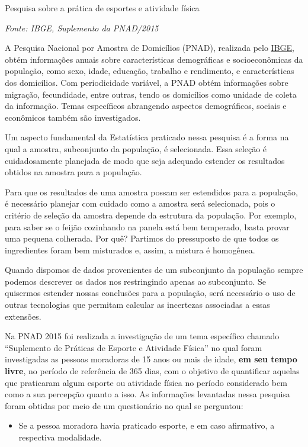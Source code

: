 \label{\detokenize{PE103-0:ativ-3-pesquisa-ibge-pnad}}
\begin{task}{ Pesquisa sobre a prática de esportes e atividade física}

\emph{Fonte: IBGE, Suplemento da PNAD/2015}

A Pesquisa Nacional por Amostra de Domicílios (PNAD), realizada pelo \href{https://www.ibge.gov.br/estatisticas-novoportal/sociais/populacao/9127-pesquisa-nacional-por-amostra-de-domicilios.html}{IBGE}, obtém informações anuais sobre características demográficas e socioeconômicas da população, como sexo, idade, educação, trabalho e rendimento, e características dos domicílios. Com periodicidade variável, a PNAD obtém informações sobre migração, fecundidade, entre outras, tendo os domicílios como unidade de coleta da informação. Temas específicos abrangendo aspectos demográficos, sociais e econômicos também são investigados.

Um aspecto fundamental da Estatística praticado nessa pesquisa é a forma na qual a amostra, subconjunto da população, é selecionada. Essa seleção é cuidadosamente planejada de modo que seja adequado estender os resultados obtidos na amostra para a população.

Para que os resultados de uma amostra possam ser estendidos para a população, é necessário planejar com cuidado como a amostra será selecionada, pois o critério de seleção da amostra depende da estrutura da população. Por exemplo, para saber se o feijão cozinhando na panela está bem temperado, basta provar uma pequena colherada. Por quê?  Partimos do pressuposto de que todos os ingredientes foram bem misturados e, assim, a mistura é homogênea.

Quando dispomos de dados provenientes de um subconjunto da população sempre podemos descrever os dados nos restringindo apenas ao subconjunto. Se quisermos estender nossas conclusões para a população, será necessário o uso de outras tecnologias que permitam calcular as incertezas associadas a essas extensões.

Na PNAD 2015 foi realizada a investigação de um tema específico chamado ``Suplemento de Práticas de Esporte e Atividade Física'' no qual foram investigadas as pessoas moradoras de 15 anos ou mais de idade, \textbf{em seu tempo livre}, no período de referência de 365 dias, com o objetivo de quantificar aquelas que praticaram algum esporte ou atividade física no período considerado bem como a sua percepção quanto a isso. As informações levantadas nessa pesquisa foram obtidas por meio de um questionário no qual se perguntou:
\begin{itemize}
\item {} 
Se a pessoa moradora havia praticado esporte, e em caso afirmativo, a respectiva modalidade.


\end{itemize}
\end{task}
